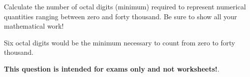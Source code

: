 

Calculate the number of octal digits (minimum) required to represent numerical quantities ranging between zero and forty thousand.  Be sure to show all your mathematical work!

\vskip 30pt







Six octal digits would be the minimum necessary to count from zero to forty thousand. 







{\bf This question is intended for exams only and not worksheets!}.




